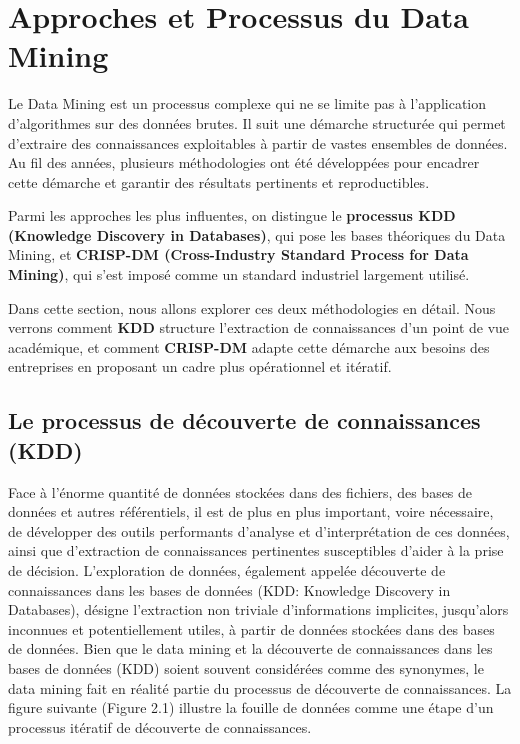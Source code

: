 \documentclass[a4paper,12pt]{report}
\begin{document}
\chapter{Approches et Processus du Data Mining}
    Le Data Mining est un processus complexe qui ne se limite pas à l’application d’algorithmes sur des données brutes. Il suit une démarche structurée qui permet d’extraire des connaissances exploitables à partir de vastes ensembles de données. Au fil des années, plusieurs méthodologies ont été développées pour encadrer cette démarche et garantir des résultats pertinents et reproductibles.
    
    Parmi les approches les plus influentes, on distingue le \textbf{processus KDD (Knowledge Discovery in Databases)}, qui pose les bases théoriques du Data Mining, et \textbf{CRISP-DM (Cross-Industry Standard Process for Data Mining)}, qui s’est imposé comme un standard industriel largement utilisé.
    
    Dans cette section, nous allons explorer ces deux méthodologies en détail. Nous verrons comment \textbf{KDD} structure l’extraction de connaissances d’un point de vue académique, et comment \textbf{CRISP-DM} adapte cette démarche aux besoins des entreprises en proposant un cadre plus opérationnel et itératif.

    \section{Le processus de découverte de connaissances (KDD)}
        Face à l'énorme quantité de données stockées dans des fichiers, des bases de données et autres référentiels, il est de plus en plus important, voire nécessaire, de développer des outils performants d'analyse et d'interprétation de ces données, ainsi que d'extraction de connaissances pertinentes susceptibles d'aider à la prise de décision.
        L'exploration de données, également appelée découverte de connaissances dans les bases de données (KDD: Knowledge Discovery in Databases), désigne l'extraction non triviale d'informations implicites, jusqu'alors inconnues et potentiellement utiles, à partir de données stockées dans des bases de données. Bien que le data mining et la découverte de connaissances dans les bases de données (KDD) soient souvent considérées comme des synonymes, le data mining fait en réalité partie du processus de découverte de connaissances. La figure suivante (Figure 2.1) illustre la fouille de données comme une étape d'un processus itératif de découverte de connaissances.\\
        \clearpage
\end{document}
